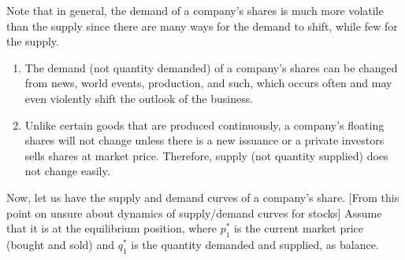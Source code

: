 \documentclass{article}
\begin{document}
    Note that in general, the demand of a company's shares is much more volatile than the supply since there are many ways for the demand to shift, while few for the supply. 
    \begin{enumerate}
      \item The demand (not quantity demanded) of a company's shares can be changed from news, world events, production, and such, which occurs often and may even violently shift the outlook of the business. 
      \item Unlike certain goods that are produced continuously, a company's floating shares will not change unless there is a new issuance or a private investors sells shares at market price. Therefore, supply (not quantity supplied) does not change easily. 
    \end{enumerate}
    Now, let us have the supply and demand curves of a company's share. [From this point on unsure about dynamics of supply/demand curves for stocks] Assume that it is at the equilibrium position, where $p^*_1$ is the current market price (bought and sold) and $q_1^*$ is the quantity demanded and supplied, as balance. 
\end{document}

